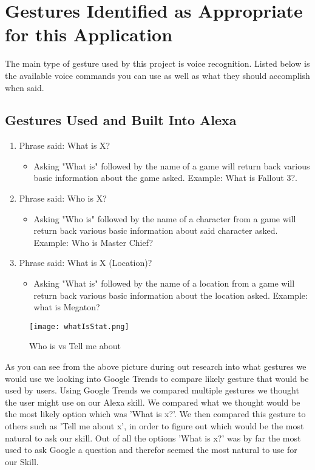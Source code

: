 \chapter{Gestures Identified as Appropriate for this Application}
The main type of gesture used by this project is voice recognition. Listed below is the available voice commands you can use as well as what they should accomplish when said. 

\section{Gestures Used and Built Into Alexa}

\begin{enumerate}
    \item Phrase said: What is X?
    \begin{itemize}
    \item Asking "What is" followed by the name of a game will return back various basic information about the game asked. Example: What is Fallout 3?.
    \end{itemize}
    
    \item Phrase said: Who is X?
    \begin{itemize}
    \item Asking "Who is" followed by the name of a character from a game will return back various basic information about said character asked. Example: Who is Master Chief?
    \end{itemize}
    
    \item Phrase said: What is X (Location)?
    \begin{itemize}
    \item Asking "What is" followed by the name of a location from a game will return back various basic information about the location asked. Example: what is Megaton?
    \end{itemize}
\end{enumerate}

\begin{figure}[h!]
    \begin{center}
        \texttt{[image: whatIsStat.png]}
        \caption{Who is vs Tell me about}
        \label{fig:gameintent}
    \end{center}
\end{figure}


As you can see from the above picture during out research into what gestures we would use we looking into Google Trends to compare likely gesture that would be used by users. Using Google Trends we compared multiple gestures we thought the user might use on our Alexa skill. We compared what we thought would be the most likely option which was 'What is x?'. We then compared this gesture to others such as 'Tell me about x', in order to figure out which would be the most natural to ask our skill. Out of all the options 'What is x?' was by far the most used to ask Google a question and therefor seemed the most natural to use for our Skill.

